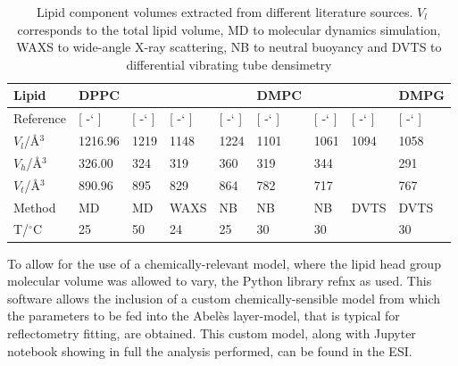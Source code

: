 \documentclass[twoside,twocolumn,9pt]{article}
\newcommand*{\citen}[1]{%
	\begingroup
	\romannumeral-`\x %
	\setcitestyle{numbers}%
	\cite{#1}%
	\endgroup   
}
\begin{document}
\begin{table}
	\small
	\caption{\ Lipid component volumes extracted from different literature sources. $V_l$ corresponds to the total lipid volume, MD to molecular dynamics simulation, WAXS to wide-angle X-ray scattering, NB to neutral buoyancy and DVTS to differential vibrating tube densimetry}
	\label{tab:water}
	\begin{tabular*}{\textwidth}{@{\extracolsep{\fill}}lllllllll}
		\hline 
		Lipid & DPPC & & & & DMPC & & & DMPG \\
		\hline
		Reference & [\citen{Armen1998}] & [\citen{Petrache1997}] & [\citen{Sun1994}] & [\citen{Tardieu1973}] & [\citen{Kucerka2004}] & [\citen{Nagle1978}] & [\citen{Schmidt1985}] & [\citen{Pan2012}] \\
		$V_l$/\AA$^3$ &1216.96 & 1219 & 1148 & 1224 & 1101 & 1061 & 1094 & 1058 \\
		$V_h$/\AA$^3$ & 326.00 & 324 & 319 & 360 & 319 & 344 & & 291 \\
		$V_t$/\AA$^3$ & 890.96 & 895 & 829 & 864 & 782 & 717 & & 767 \\
		Method & MD & MD & WAXS & NB & NB & NB & DVTS & DVTS \\
		T/$^\circ$C & 25 & 50 & 24 & 25 & 30 & 30 & & 30 \\
		\hline
	\end{tabular*}
\end{table}

To allow for the use of a chemically-relevant model, where the lipid head group molecular volume was allowed to vary, the Python library refnx\cite{Nelson2018} as used. This software allows the inclusion of a custom chemically-sensible model from which the parameters to be fed into the Abel\`{e}s layer-model,\cite{Abeles1950,Parratt1954} that is typical for reflectometry fitting, are obtained. This custom model, along with Jupyter notebook showing in full the analysis performed, can be found in the ESI. 
\end{document}
